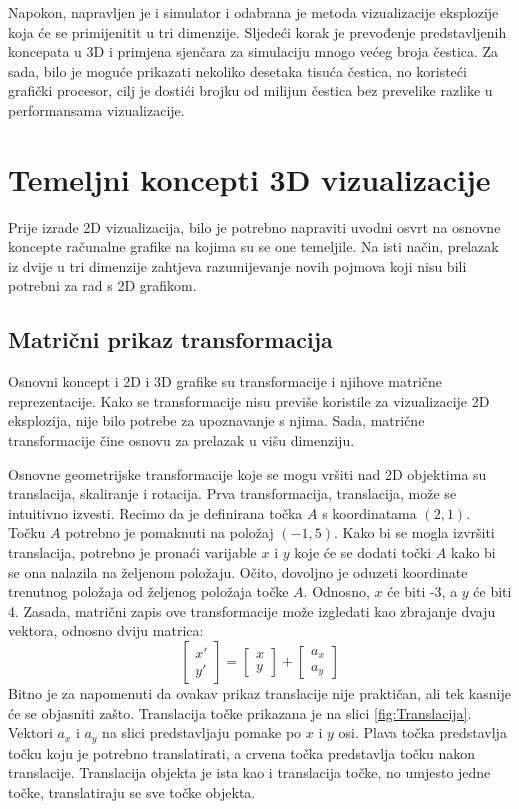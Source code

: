 \documentclass{foi}
\begin{document}
Napokon, napravljen je i simulator i odabrana je metoda vizualizacije eksplozije koja će se primijenitit u tri dimenzije. Sljedeći korak je prevođenje predstavljenih koncepata u 3D i primjena sjenčara za simulaciju mnogo većeg broja čestica. Za sada, bilo je moguće prikazati nekoliko desetaka tisuća čestica, no koristeći grafički procesor, cilj je dostići brojku od milijun čestica bez prevelike razlike u performansama vizualizacije.

\chapter{Temeljni koncepti 3D vizualizacije}
Prije izrade 2D vizualizacija, bilo je potrebno napraviti uvodni osvrt na osnovne koncepte računalne grafike na kojima su se one temeljile. Na isti način, prelazak iz dvije u tri dimenzije zahtjeva razumijevanje novih pojmova koji nisu bili potrebni za rad s 2D grafikom.  

\section{Matrični prikaz transformacija}
Osnovni koncept i 2D i 3D grafike su transformacije i njihove matrične reprezentacije. Kako se transformacije nisu previše koristile za vizualizacije 2D eksplozija, nije bilo potrebe za upoznavanje s njima. Sada, matrične transformacije čine osnovu za prelazak u višu dimenziju.

Osnovne geometrijske transformacije koje se mogu vršiti nad 2D objektima su translacija, skaliranje i rotacija. Prva transformacija, translacija, može se intuitivno izvesti. Recimo da je definirana točka $A$ s koordinatama $(2, 1)$. Točku $A$ potrebno je pomaknuti na položaj $(-1, 5)$. Kako bi se mogla izvršiti translacija, potrebno je pronaći varijable $x$ i $y$ koje će se dodati točki $A$ kako bi se ona nalazila na željenom položaju. Očito, dovoljno je oduzeti koordinate trenutnog položaja od željenog položaja točke $A$. Odnosno, $x$ će biti -3, a $y$ će biti 4. Zasada, matrični zapis ove transformacije može izgledati kao zbrajanje dvaju vektora, odnosno dviju matrica:
\[
\begin{bmatrix}
x'\\
y' 
\end{bmatrix}
=
\begin{bmatrix}
x\\
y
\end{bmatrix}
+
\begin{bmatrix}
a_x\\
a_y
\end{bmatrix}
\]
Bitno je za napomenuti da ovakav prikaz translacije nije praktičan, ali tek kasnije će se objasniti zašto. Translacija točke prikazana je na slici \ref{fig:Translacija}. Vektori $a_x$ i $a_y$ na slici predstavljaju pomake po $x$ i $y$ osi. Plava točka predstavlja točku koju je potrebno translatirati, a crvena točka predstavlja točku nakon translacije. Translacija objekta je ista kao i translacija točke, no umjesto jedne točke, translatiraju se sve točke objekta. 
\end{document}
